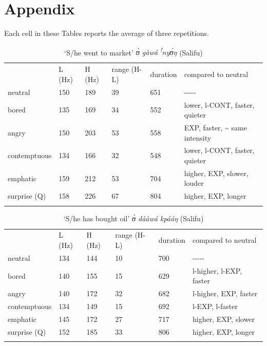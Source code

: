\documentclass[output=paper]{langsci/langscibook}
\begin{document}
\section*{Appendix}

Each cell in these Tables reports the average of three repetitions.


\begin{table}
\caption{‘S/he went to market'	 \emph{ʊ̀ gàwá \textsuperscript{!}nyʊ́ŋ} (Salifu)}

\begin{tabular}{llllll} & L (Hz) & H (Hz) & range (H-L) & duration & compared to neutral\\
\lsptoprule
neutral & 150 & 189 & 39 & 651 & {}-{}-{}-{}-{}-\\
bored & 135 & 169 & 34 & 552 & lower, l-CONT, faster, quieter\\
angry & 150 & 203 & 53 & 558 & EXP, faster, \~{} same intensity\\
contemptuous & 134 & 166 & 32 & 548 & lower, l-CONT, faster, quieter\\
emphatic & 159 & 212 & 53 & 704 & higher, EXP, slower, louder\\
surprise (Q) & 158 & 226 & 67 & 804 & higher, EXP, longer\\
\lspbottomrule
\end{tabular}
\end{table}

\begin{table}
\caption{‘S/he has bought oil'  \emph{ʊ̀ dààwá kpááŋ}  (Salifu)}

\begin{tabular}{llllll} & L (Hz) & H (Hz) & range (H-L) & duration & compared to neutral\\
\lsptoprule
neutral & 134 & 144 & 10 & 700 & {}-{}-{}-{}-{}-\\
bored & 140 & 155 & 15 & 629 & l-higher, l-EXP, faster\\
angry & 140 & 172 & 32 & 682 & l-higher, EXP, faster\\
contemptuous & 134 & 149 & 15 & 692 & l-EXP, l-faster\\
emphatic & 145 & 172 & 27 & 717 & higher, EXP, slower\\
surprise (Q) & 152 & 185 & 33 & 806 & higher, EXP, longer\\
\lspbottomrule
\end{tabular}
\end{table}
\end{document}

